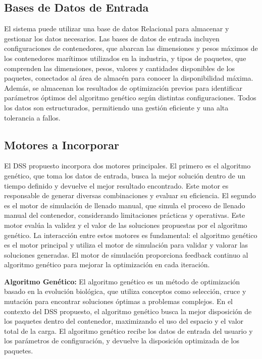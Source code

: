 \documentclass[9pt,a4paper]{rho}
\begin{document}
\subsection{Bases de Datos de Entrada}

El sistema puede utilizar una base de datos \cite{elmasri2021fundamentals} Relacional para almacenar y gestionar los datos necesarios. Las bases de datos de entrada incluyen configuraciones de contenedores, que abarcan las dimensiones y pesos máximos de los contenedores marítimos utilizados en la industria, y tipos de paquetes, que comprenden las dimensiones, pesos, valores y cantidades disponibles de los paquetes, conectados al área de almacén para conocer la disponibilidad máxima. Además, se almacenan los resultados de optimización previos para identificar parámetros óptimos del algoritmo genético según distintas configuraciones. Todos los datos son estructurados, permitiendo una gestión eficiente y una alta tolerancia a fallos.

\subsection{Motores a Incorporar}

El DSS propuesto incorpora dos motores principales. El primero es el algoritmo genético, que toma los datos de entrada, busca la mejor solución dentro de un tiempo definido y devuelve el mejor resultado encontrado. Este motor es responsable de generar diversas combinaciones y evaluar su eficiencia. El segundo es el motor de simulación de llenado manual, que simula el proceso de llenado manual del contenedor, considerando limitaciones prácticas y operativas. Este motor evalúa la validez y el valor de las soluciones propuestas por el algoritmo genético. La interacción entre estos motores es fundamental: el algoritmo genético es el motor principal y utiliza el motor de simulación para validar y valorar las soluciones generadas. El motor de simulación proporciona feedback continuo al algoritmo genético para mejorar la optimización en cada iteración.

\textbf{Algoritmo Genético:} El algoritmo genético es un método de optimización basado en la evolución biológica, que utiliza conceptos como selección, cruce y mutación para encontrar soluciones óptimas a problemas complejos. En el contexto del DSS propuesto, el algoritmo genético busca la mejor disposición de los paquetes dentro del contenedor, maximizando el uso del espacio y el valor total de la carga. El algoritmo genético recibe los datos de entrada del usuario y los parámetros de configuración, y devuelve la disposición optimizada de los paquetes.
\end{document}
